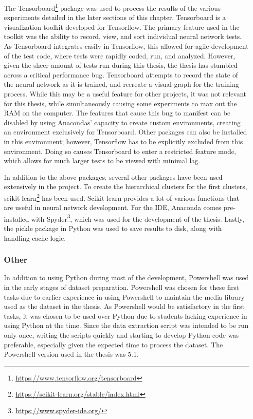 The Tensorboard\footnote{\url{https://www.tensorflow.org/tensorboard}} package was used to process the results of the various experiments detailed in the later sections of this chapter.
Tensorboard is a visualization toolkit developed for Tensorflow.
The primary feature used in the toolkit was the ability to record, view, and sort individual neural network tests.
As Tensorboard integrates easily in Tensorflow, this allowed for agile development of the test code, where tests were rapidly coded, run, and analyzed.
However, given the sheer amount of tests run during this thesis, the thesis has stumbled across a critical performance bug.
Tensorboard attempts to record the state of the neural network as it is trained, and recreate a visual graph for the training process.
While this may be a useful feature for other projects, it was not relevant for this thesis, while simultaneously causing some experiments to max out the RAM on the computer.
The features that cause this bug to manifest can be disabled by using Anacondas' capacity to create custom environments, creating an environment exclusively for Tensorboard.
Other packages can also be installed in this environment; however, Tensorflow has to be explicitly excluded from this environment.
Doing so causes Tensorboard to enter a restricted feature mode, which allows for much larger tests to be viewed with minimal lag.

In addition to the above packages, several other packages have been used extensively in the project.
To create the hierarchical clusters for the first clusters, scikit-learn\footnote{\url{https://scikit-learn.org/stable/index.html}} has been used.
Scikit-learn provides a lot of various functions that are useful in neural network development.
For the IDE, Anaconda comes pre-installed with Spyder\footnote{\url{https://www.spyder-ide.org/}}, which was used for the development of the thesis.
Lastly, the pickle package in Python was used to save results to disk, along with handling cache logic.


\subsubsection{Other}
In addition to using Python during most of the development, Powershell was used in the early stages of dataset preparation.
Powershell was chosen for these first tasks due to earlier experience in using Powershell to maintain the media library used as the dataset in the thesis.
As Powershell would be satisfactory in the first tasks, it was chosen to be used over Python due to students lacking experience in using Python at the time.
Since the data extraction script was intended to be run only once, writing the scripts quickly and starting to develop Python code was preferable, especially given the expected time to process the dataset.
The Powershell version used in the thesis was 5.1.

